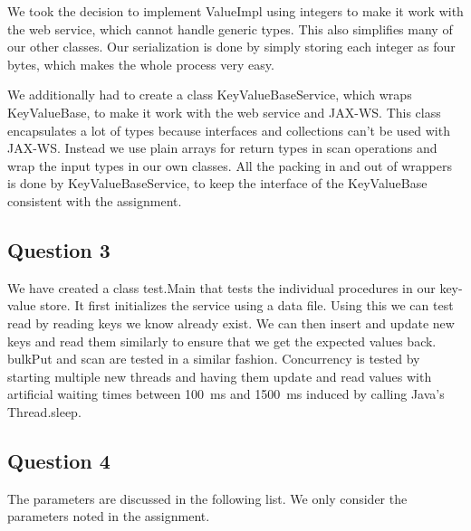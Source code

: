 \documentclass[a4paper,final]{article}
\newcommand{\mono}[1]{{\ttfamily#1}}
\begin{document}
We took the decision to implement \mono{ValueImpl} using integers to make it
work with the web service, which cannot handle generic types. This also
simplifies many of our other classes. Our serialization is done by simply
storing each integer as four bytes, which makes the whole process very easy.

We additionally had to create a class \mono{KeyValueBaseService}, which wraps
\mono{KeyValueBase}, to make it work with the web service and JAX-WS. This
class encapsulates a lot of types because interfaces and collections can't be
used with JAX-WS. Instead we use plain arrays for return types in scan
operations and wrap the input types in our own classes. All the packing in
and out of wrappers is done by \mono{KeyValueBaseService}, to keep the
interface of the \mono{KeyValueBase} consistent with the assignment.

\subsection*{Question 3}

We have created a class \mono{test.Main} that tests the individual procedures
in our key-value store. It first initializes the service using a data file.
Using this we can test \mono{read} by reading keys we know already exist. We
can then \mono{insert} and \mono{update} new keys and read them similarly to
ensure that we get the expected values back. \mono{bulkPut} and \mono{scan} are
tested in a similar fashion. Concurrency is tested by starting multiple new
threads and having them \mono{update} and \mono{read} values with artificial
waiting times between 100~ms and 1500~ms induced by calling Java's
\mono{Thread.sleep}.

\subsection*{Question 4}
The parameters are discussed in the following list. We only consider the
parameters noted in the assignment.
\end{document}
